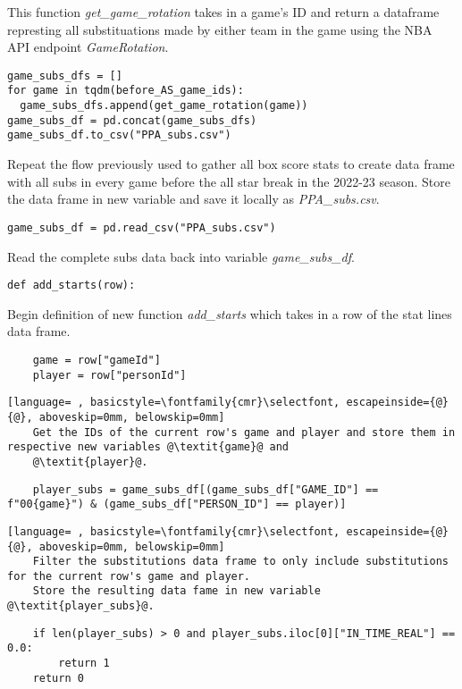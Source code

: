 \documentclass{article}
\begin{document}
This function \textit{get_game_rotation} takes in a game's ID and return a dataframe represting all substituations made by either team in the game using the NBA API endpoint \textit{GameRotation}.
\begin{lstlisting}
game_subs_dfs = []
for game in tqdm(before_AS_game_ids):
  game_subs_dfs.append(get_game_rotation(game))
game_subs_df = pd.concat(game_subs_dfs)
game_subs_df.to_csv("PPA_subs.csv")
\end{lstlisting}
Repeat the flow previously used to gather all box score stats to create data frame with all subs in every game before the all star break in the 2022-23 season. Store the data frame in new variable  and save it locally as \textit{PPA_subs.csv}.
\begin{lstlisting}
game_subs_df = pd.read_csv("PPA_subs.csv")
\end{lstlisting}
Read the complete subs data back into variable \textit{game_subs_df}.
\begin{lstlisting}
def add_starts(row):
\end{lstlisting}
Begin definition of new function \textit{add_starts} which takes in a row of the stat lines data frame.
\begin{lstlisting}
    game = row["gameId"]
    player = row["personId"]
\end{lstlisting}
\begin{lstlisting}[language= , basicstyle=\fontfamily{cmr}\selectfont, escapeinside={@}{@}, aboveskip=0mm, belowskip=0mm]
    Get the IDs of the current row's game and player and store them in respective new variables @\textit{game}@ and
    @\textit{player}@.
\end{lstlisting}
\begin{lstlisting}
    player_subs = game_subs_df[(game_subs_df["GAME_ID"] == f"00{game}") & (game_subs_df["PERSON_ID"] == player)]
\end{lstlisting}
\begin{lstlisting}[language= , basicstyle=\fontfamily{cmr}\selectfont, escapeinside={@}{@}, aboveskip=0mm, belowskip=0mm]
    Filter the substitutions data frame to only include substitutions for the current row's game and player.
    Store the resulting data fame in new variable @\textit{player_subs}@.
\end{lstlisting}
\begin{lstlisting}
    if len(player_subs) > 0 and player_subs.iloc[0]["IN_TIME_REAL"] == 0.0:
        return 1
    return 0
\end{lstlisting}
\end{document}
